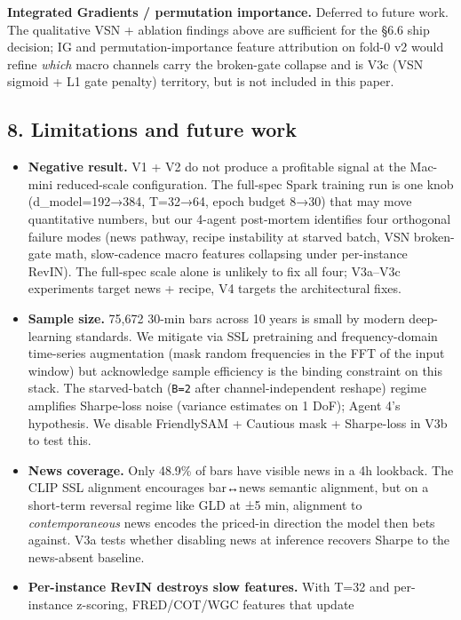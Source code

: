\documentclass[
]{article}
\begin{document}
\textbf{Integrated Gradients / permutation importance.} Deferred to
future work. The qualitative VSN + ablation findings above are
sufficient for the §6.6 ship decision; IG and permutation-importance
feature attribution on fold-0 v2 would refine \emph{which} macro
channels carry the broken-gate collapse and is V3c (VSN sigmoid + L1
gate penalty) territory, but is not included in this paper.

\subsection{8. Limitations and future
work}\label{limitations-and-future-work}

\begin{itemize}
\item
  \textbf{Negative result.} V1 + V2 do not produce a profitable signal
  at the Mac-mini reduced-scale configuration. The full-spec Spark
  training run is one knob (d\_model=192→384, T=32→64, epoch budget
  8→30) that may move quantitative numbers, but our 4-agent post-mortem
  identifies four orthogonal failure modes (news pathway, recipe
  instability at starved batch, VSN broken-gate math, slow-cadence macro
  features collapsing under per-instance RevIN). The full-spec scale
  alone is unlikely to fix all four; V3a--V3c experiments target news +
  recipe, V4 targets the architectural fixes.
\item
  \textbf{Sample size.} 75,672 30-min bars across 10 years is small by
  modern deep-learning standards. We mitigate via SSL pretraining and
  frequency-domain time-series augmentation (mask random frequencies in
  the FFT of the input window) but acknowledge sample efficiency is the
  binding constraint on this stack. The starved-batch (\texttt{B=2}
  after channel-independent reshape) regime amplifies Sharpe-loss noise
  (variance estimates on 1 DoF); Agent 4's hypothesis. We disable
  FriendlySAM + Cautious mask + Sharpe-loss in V3b to test this.
\item
  \textbf{News coverage.} Only 48.9\% of bars have visible news in a 4h
  lookback. The CLIP SSL alignment encourages bar↔news semantic
  alignment, but on a short-term reversal regime like GLD at ±5 min,
  alignment to \emph{contemporaneous} news encodes the priced-in
  direction the model then bets against. V3a tests whether disabling
  news at inference recovers Sharpe to the news-absent baseline.
\item
  \textbf{Per-instance RevIN destroys slow features.} With T=32 and
  per-instance z-scoring, FRED/COT/WGC features that update

\end{itemize}
\end{document}
